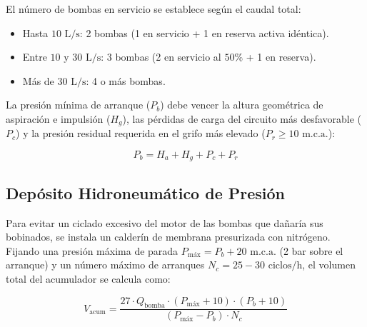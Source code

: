 \documentclass{report}
\begin{document}
El número de bombas en servicio se establece según el caudal total:

\begin{itemize}

    \item Hasta $10\text{ L/s}$: 2 bombas (1 en servicio + 1 en reserva activa idéntica).

    \item Entre $10\text{ y }30\text{ L/s}$: 3 bombas (2 en servicio al $50\%$ + 1 en reserva).

    \item Más de $30\text{ L/s}$: 4 o más bombas.

\end{itemize}



La presión mínima de arranque ($P_b$) debe vencer la altura geométrica de aspiración e impulsión ($H_g$), las pérdidas de carga del circuito más desfavorable ($P_c$) y la presión residual requerida en el grifo más elevado ($P_r \ge 10\text{ m.c.a.}$):

\begin{equation}

    P_b = H_a + H_g + P_c + P_r

\end{equation}



\subsection{Depósito Hidroneumático de Presión}

Para evitar un ciclado excesivo del motor de las bombas que dañaría sus bobinados, se instala un calderín de membrana presurizada con nitrógeno. Fijando una presión máxima de parada $P_{\text{máx}} = P_b + 20\text{ m.c.a.}$ (2 bar sobre el arranque) y un número máximo de arranques $N_c = 25-30\text{ ciclos/h}$, el volumen total del acumulador se calcula como:

\begin{equation}

    V_{\text{acum}} = \frac{27 \cdot Q_{\text{bomba}} \cdot (P_{\text{máx}} + 10) \cdot (P_b + 10)}{(P_{\text{máx}} - P_b) \cdot N_c}

\end{equation}



\end{document}
